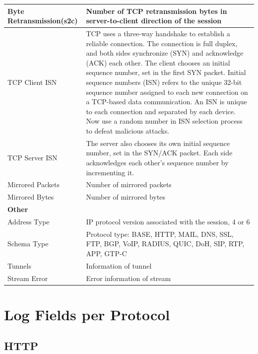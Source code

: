 \begin{longtable}{p{}|p{}}
    Byte Retransmission(s2c) &	Number of TCP retransmission bytes in server-to-client direction of the session \\\hline
    TCP Client ISN &	TCP uses a three-way handshake to establish a reliable connection. The connection is full duplex, and both sides synchronize (SYN) and acknowledge (ACK) each other. The client chooses an initial sequence number, set in the first SYN packet. Initial sequence numbers (ISN) refers to the unique 32-bit sequence number assigned to each new connection on a TCP-based data communication. An ISN is unique to each connection and separated by each device. Now use a random number in ISN selection process to defeat malicious attacks.\\\hline
    TCP Server ISN &	The server also chooses its own initial sequence number, set in the SYN/ACK packet. Each side acknowledges each other's sequence number by incrementing it.\\\hline
    Mirrored Packets &	Number of mirrored packets \\\hline
    Mirrored Bytes &	Number of mirrored bytes\\\hline
    \multicolumn{2}{l}{\textbf{Other}} \\\hline
    Address Type &	IP protocol version associated with the session, 4 or 6 \\\hline
    Schema Type &	Protocol type: BASE, HTTP, MAIL, DNS, SSL, FTP, BGP, VoIP, RADIUS, QUIC, DoH, SIP, RTP, APP, GTP-C \\\hline
    Tunnels &	Information of tunnel \\\hline
    Stream Error &	Error information of stream\\\hline                  
\end{longtable}

\section*{\hypertarget{link:Log Fields per Protocol}{Log Fields per Protocol}}
\label{sec:appendix_c:protocol}

\subsection*{\hypertarget{link:HTTP}{HTTP}}
\label{sec:appendix_c:protocol:HTTP}

